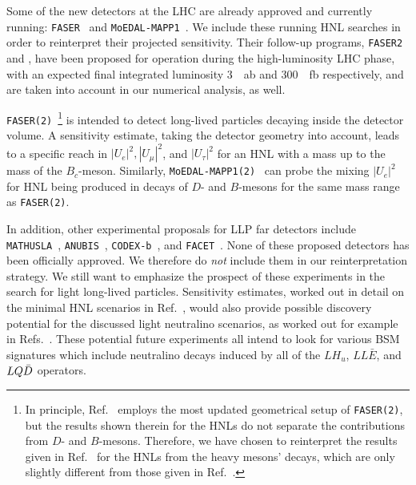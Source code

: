 Some of the new detectors at the LHC are already approved and currently running: \texttt{FASER}~\cite{Feng:2017uoz} 
and \texttt{MoEDAL-MAPP1}~\cite{Pinfold:2019nqj}. We include these running HNL searches in order to 
reinterpret their projected sensitivity.
Their follow-up programs, \texttt{FASER2}~\cite{FASER:2018eoc} and , have been proposed for operation during the high-luminosity LHC phase, with an expected final integrated luminosity \SI{3}{\per\atto\barn} and \SI{300}{\per\femto\barn} respectively, and are taken into account in our numerical analysis, as well.


\texttt{FASER(2)}~\cite{Kling:2018wct}\footnote{In principle, Ref.~\cite{FASER:2018eoc} employs the most 
updated geometrical setup of \texttt{FASER(2)}, but the results shown therein for the HNLs do not separate 
the contributions from $D$- and $B$-mesons. Therefore, we have chosen to reinterpret the results given in 
Ref.~\cite{Kling:2018wct} for the HNLs from the heavy mesons' decays, which are only slightly different 
from those given in Ref.~\cite{FASER:2018eoc}.} is intended to detect long-lived 
particles decaying inside the detector volume.
A sensitivity estimate, taking the detector geometry into account, leads to a specific reach in $|U_e|^2, |U_\mu|^2$, and $|U_\tau|^2$ for an HNL with a mass up to the mass of the $B_c$-meson.
Similarly, \texttt{MoEDAL-MAPP1(2)}~\cite{DeVries:2020jbs,Beltran:2023nli} can probe the mixing $|U_e|^2$ for HNL being produced in decays of $D$- and $B$-mesons for the same mass range as \texttt{FASER(2)}.



In addition, other experimental proposals for LLP far detectors include \texttt{MATHUSLA}~\cite{Chou:2016lxi, 
Curtin:2018mvb, MATHUSLA:2020uve}, \texttt{ANUBIS}~\cite{Bauer:2019vqk}, \texttt{CODEX-b}~\cite{Gligorov:2017nwh}, 
and \texttt{FACET}~\cite{Cerci:2021nlb}. None of these proposed detectors has been officially approved. We 
therefore do \textit{not} include them in our reinterpretation strategy. We still want to 
emphasize the prospect of these experiments in the search for light long-lived particles. Sensitivity estimates, 
worked out in detail on the minimal HNL scenarios in Ref.~\cite{DeVries:2020jbs}, would also provide possible 
discovery potential for the discussed light neutralino scenarios, as worked out for example in 
Refs.~\cite{Dercks:2018eua,Dercks:2018wum, Dreiner:2020qbi,Dreiner:2022swd}. These potential future experiments all intend to 
look for various BSM signatures which include neutralino decays induced by all of the $LH_u$, $LL \bar E$, 
and $LQ\Bar{D}$ operators.

